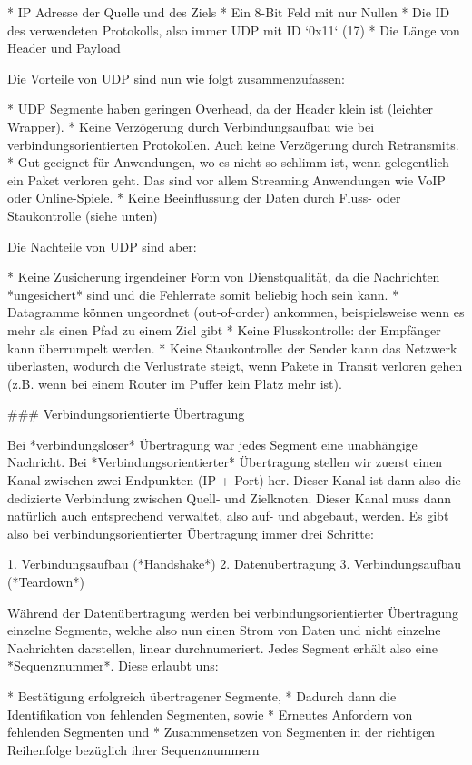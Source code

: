 * IP Adresse der Quelle und des Ziels
* Ein 8-Bit Feld mit nur Nullen
* Die ID des verwendeten Protokolls, also immer UDP mit ID `0x11` (17)
* Die Länge von Header und Payload

Die Vorteile von UDP sind nun wie folgt zusammenzufassen:

* UDP Segmente haben geringen Overhead, da der Header klein ist (leichter
  Wrapper).
* Keine Verzögerung durch Verbindungsaufbau wie bei verbindungsorientierten
  Protokollen. Auch keine Verzögerung durch Retransmits.
* Gut geeignet für Anwendungen, wo es nicht so schlimm ist, wenn gelegentlich
  ein Paket verloren geht. Das sind vor allem Streaming Anwendungen wie VoIP
  oder Online-Spiele.
* Keine Beeinflussung der Daten durch Fluss- oder Staukontrolle (siehe unten)

Die Nachteile von UDP sind aber:

* Keine Zusicherung irgendeiner Form von Dienstqualität, da die Nachrichten
  *ungesichert* sind und die Fehlerrate somit beliebig hoch sein kann.
* Datagramme können ungeordnet (out-of-order) ankommen, beispielsweise wenn es
  mehr als einen Pfad zu einem Ziel gibt
* Keine Flusskontrolle: der Empfänger kann überrumpelt werden.
* Keine Staukontrolle: der Sender kann das Netzwerk überlasten, wodurch die
  Verlustrate steigt, wenn Pakete in Transit verloren gehen (z.B. wenn bei einem
  Router im Puffer kein Platz mehr ist).

### Verbindungsorientierte Übertragung

Bei *verbindungsloser* Übertragung war jedes Segment eine unabhängige
Nachricht. Bei *Verbindungsorientierter* Übertragung stellen wir zuerst einen
Kanal zwischen zwei Endpunkten (IP + Port) her. Dieser Kanal ist dann also die
dedizierte Verbindung zwischen Quell- und Zielknoten. Dieser Kanal muss dann
natürlich auch entsprechend verwaltet, also auf- und abgebaut, werden. Es gibt
also bei verbindungsorientierter Übertragung immer drei Schritte:

1. Verbindungsaufbau (*Handshake*)
2. Datenübertragung
3. Verbindungsaufbau (*Teardown*)

Während der Datenübertragung werden bei verbindungsorientierter Übertragung
einzelne Segmente, welche also nun einen Strom von Daten und nicht einzelne
Nachrichten darstellen, linear durchnumeriert. Jedes Segment erhält also eine
*Sequenznummer*. Diese erlaubt uns:

* Bestätigung erfolgreich übertragener Segmente,
* Dadurch dann die Identifikation von fehlenden Segmenten, sowie
* Erneutes Anfordern von fehlenden Segmenten und
* Zusammensetzen von Segmenten in der richtigen Reihenfolge bezüglich ihrer
  Sequenznummern

